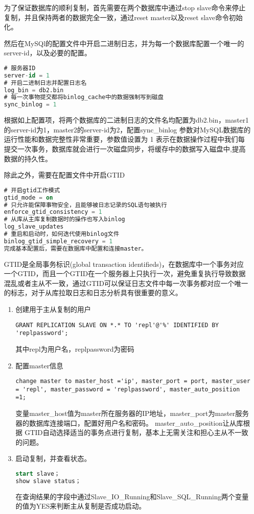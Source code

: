 为了保证数据库的顺利复制，首先需要在两个数据库中通过stop slave命令来停止复制，并且保持两者的数据完全一致，通过reset master以及reset slave命令初始化。

然后在MySQl的配置文件中开启二进制日志，并为每一个数据库配置一个唯一的server-id，以及必要的配置。
\begin{lstlisting}[language=sql,numbers=none]
# 服务器ID
server-id = 1
# 开启二进制日志并配置日志名
log_bin = db2.bin
# 每一次事物提交都将binlog_cache中的数据强制写到磁盘
sync_binlog = 1
\end{lstlisting}
根据如上配置项，将两个数据库的二进制日志的文件名均配置为db2.bin，master1的server-id为1，master2的server-id为2，配置sync\_binlog 参数对MySQL数据库的运行性能和数据完整性非常重要，参数值设置为 1 表示在数据操作过程中我们每提交一次事务，数据库就会进行一次磁盘同步，将缓存中的数据写入磁盘中,提高数据的持久性。

除此之外，需要在配置文件中开启GTID
\begin{lstlisting}[language=sql,numbers=none]
# 开启gtid工作模式
gtid_mode = on
# 只允许能保障事物安全，且能够被日志记录的SQL语句被执行
enforce_gtid_consistency = 1
# 从库从主库复制数据时的操作也写入binlog
log_slave_updates
# 重启和启动时，如何迭代使用binlog文件
binlog_gtid_simple_recovery = 1
完成基本配置后，需要在数据库中配置和连接master。
\end{lstlisting}
GTID是全局事务标识(global transaction identifieds)，在数据库中一个事务对应一个GTID，而且一个GTID在一个服务器上只执行一次，避免重复执行导致数据混乱或者主从不一致，通过GTID可以保证日志文件中每一次事务都对应一个唯一的标志，对于从库拉取日志和日志分析具有很重要的意义。
\begin{enumerate}
\item 创建用于主从复制的用户
\begin{lstlisting}[numbers=none]
GRANT REPLICATION SLAVE ON *.* TO 'repl'@'%' IDENTIFIED BY 'replpassword';
\end{lstlisting}
其中repl为用户名，replpassword为密码
\item 配置master信息
\begin{lstlisting}[numbers=none]
change master to master_host ='ip', master_port = port, master_user = 'repl', master_password = 'replpassword', master_auto_position =1;
\end{lstlisting}
变量master\_host值为master所在服务器的IP地址，master\_port为master服务器的数据库连接端口，配置好用户名和密码。
master\_auto\_position让从库根据 GTID自动选择适当的事务点进行复制，基本上无需关注和担心主从不一致的问题。
\item 启动复制，并查看状态。
\begin{lstlisting}[language=sql,numbers=none]
start slave；
show slave status；
\end{lstlisting}
在查询结果的字段中通过Slave\_IO\_Running和Slave\_SQL\_Running两个变量的值为YES来判断主从复制是否成功启动。
\end{enumerate}

